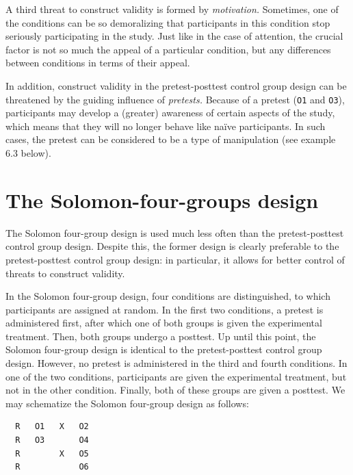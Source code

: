 \documentclass[
]{book}
\begin{document}
A third threat to construct validity is formed by \emph{motivation.} Sometimes, one of the conditions can be so demoralizing that participants in this condition stop seriously participating in the study. Just like in the case of attention, the crucial factor is not so much the appeal of a particular condition, but any differences between conditions in terms of their appeal.

In addition, construct validity in the pretest-posttest control group design can be threatened by the guiding influence of \emph{pretests.} Because of a pretest (\texttt{O1} and \texttt{O3}), participants may develop a (greater) awareness of certain aspects of the study, which means that they will no longer behave like naïve participants. In such cases, the pretest can be considered to be a type of manipulation (see example 6.3 below).

\hypertarget{sec:solomon-four-groups-design}{%
\section{The Solomon-four-groups design}\label{sec:solomon-four-groups-design}}

The Solomon four-group design is used much less often than the pretest-posttest control group design. Despite this, the former design is clearly preferable to the pretest-posttest control group design: in particular, it allows for better control of threats to construct validity.

In the Solomon four-group design, four conditions are distinguished, to which participants are assigned at random. In the first two conditions, a pretest is administered first, after which one of both groups is given the experimental treatment. Then, both groups undergo a posttest. Up until this point, the Solomon four-group design is identical to the pretest-posttest control group design. However, no pretest is administered in the third and fourth conditions. In one of the two conditions, participants are given the experimental treatment, but not in the other condition. Finally, both of these groups are given a posttest. We may schematize the Solomon four-group design as follows:

\begin{verbatim}
  R   O1   X   O2
  R   O3       O4
  R        X   O5
  R            O6
\end{verbatim}
\end{document}
